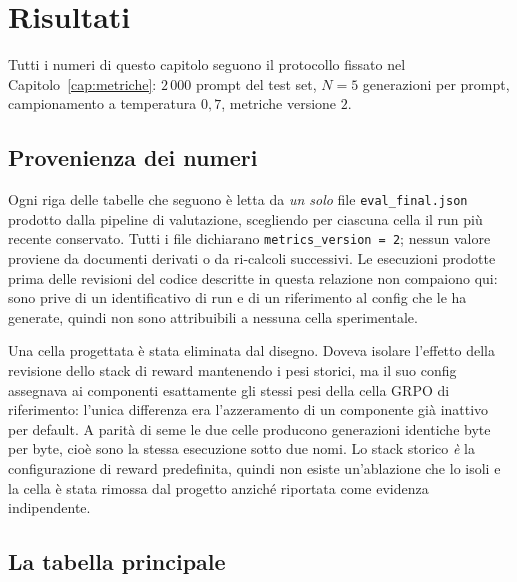 \chapter{Risultati}
\label{cap:risultati}

Tutti i numeri di questo capitolo seguono il protocollo fissato nel
Capitolo~\ref{cap:metriche}: $2\,000$ prompt del test set, $N=5$ generazioni per
prompt, campionamento a temperatura $0{,}7$, metriche versione $2$.

\section{Provenienza dei numeri}
\label{sec:provenienza}

Ogni riga delle tabelle che seguono è letta da \emph{un solo} file
\texttt{eval\_final.json} prodotto dalla pipeline di valutazione, scegliendo per
ciascuna cella il run più recente conservato. Tutti i file dichiarano
\texttt{metrics\_version = 2}; nessun valore proviene da documenti derivati o da
ri-calcoli successivi. Le esecuzioni prodotte prima delle revisioni del codice
descritte in questa relazione non compaiono qui: sono prive di un
identificativo di run e di un riferimento al config che le ha generate, quindi
non sono attribuibili a nessuna cella sperimentale.

Una cella progettata è stata eliminata dal disegno. Doveva isolare l'effetto
della revisione dello stack di reward mantenendo i pesi storici, ma il suo
config assegnava ai componenti esattamente gli stessi pesi della cella GRPO di
riferimento: l'unica differenza era l'azzeramento di un componente già inattivo
per default. A parità di seme le due celle producono generazioni identiche byte
per byte, cioè sono la stessa esecuzione sotto due nomi. Lo stack storico
\emph{è} la configurazione di reward predefinita, quindi non esiste
un'ablazione che lo isoli e la cella è stata rimossa dal progetto anziché
riportata come evidenza indipendente.

\section{La tabella principale}

